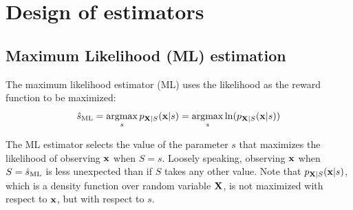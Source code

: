 \section{Design of estimators}

\subsection{Maximum Likelihood (ML) estimation}

The maximum likelihood estimator (ML) uses the likelihood as the reward function to be maximized:
\begin{equation}
\hat{s}_\text{ML} = \operatorname*{argmax}_s p_{{\bf X}|S}({\bf x}|s)
     = \operatorname*{argmax}_s \ln(p_{{\bf X}|S}({\bf x}|s))
\label{ec:est_ML}
\end{equation}

The ML estimator selects the value of the parameter $s$ that maximizes the likelihood of observing ${\bf x}$ when $S=s$. Loosely speaking, observing ${\bf x}$ when $S=\hat{s}_\text{ML}$ is less unexpected than if $S$ takes any other value. Note that $p_{{\bf X}|S}({\bf x}|s)$, which is a density function over random variable ${\bf X}$, is not maximized with respect to ${\bf x}$, but with respect to $s$. 

